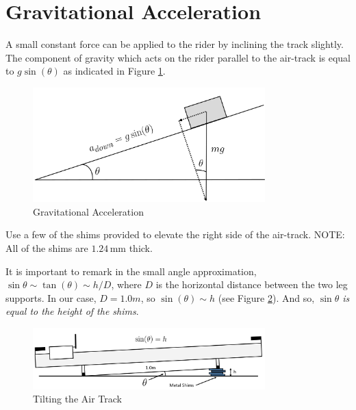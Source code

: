 \section{Gravitational Acceleration}

A small constant force can be applied to the rider by inclining the track slightly.  The component of gravity which acts on the rider parallel to the air-track is equal to $g\sin(\theta)$ as indicated in Figure \ref{fig:slope}.

\begin{figure}[h]
    \begin{center}
        \includegraphics[width=0.8\textwidth]{./Exp2/pic/image14.jpg}
    \end{center}
    \caption{Gravitational Acceleration}
    \label{fig:slope}
\end{figure}

Use a few of the shims provided to elevate the right side of the air-track. NOTE: All of the shims are $1.24\,\mathrm{mm}$ thick. \myskip

It is important to remark in the small angle approximation, $\sin\theta \sim \tan(\theta) \sim h/D$, where $D$ is the horizontal distance between the two leg supports. In our case, $D=1.0m$, so $\sin(\theta) \sim h$ (see Figure \ref{fig:shims}). And so, {\it{ $\sin\theta$ is equal to the height of the shims}}.
\begin{figure}[h]
    \begin{center}
        \includegraphics[width=0.8\textwidth]{./Exp2/pic/image15.jpg}
    \end{center}
    \caption{Tilting the Air Track}
    \label{fig:shims}
\end{figure}

